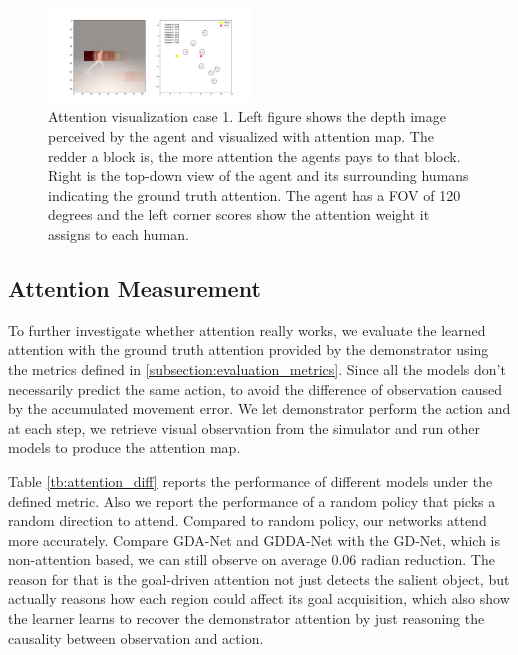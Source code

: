 \documentclass[10pt,twocolumn,letterpaper]{article}
\begin{document}
\begin{figure}[tb]\label{fig:attention_visualization}
  \centering
  \includegraphics[width=0.48\textwidth]{figures/attention_8h_3.png}
  \caption{Attention visualization case 1. Left figure shows the depth image perceived by the agent and visualized with attention map. The redder a block is, the more attention the agents pays to that block. Right is the top-down view of the agent and its surrounding humans indicating the ground truth attention. The agent has a FOV of 120 degrees and the left corner scores show the attention weight it assigns to each human.}
\end{figure}

\subsection{Attention Measurement}
To further investigate whether attention really works, we evaluate the learned attention with the ground truth attention provided by the demonstrator using the metrics defined in \ref{subsection:evaluation_metrics}. Since all the models don't necessarily predict the same action, to avoid the difference of observation caused by the accumulated movement error. We let demonstrator perform the action and at each step, we retrieve visual observation from the simulator and run other models to produce the attention map.

Table \ref{tb:attention_diff} reports the performance of different models under the defined metric. Also we report the performance of a random policy that picks a random direction to attend. Compared to random policy, our networks attend more accurately. Compare GDA-Net and GDDA-Net with the GD-Net, which is non-attention based, we can still observe on average 0.06 radian reduction. The reason for that is the goal-driven attention not just detects the salient object, but actually reasons how each region could affect its goal acquisition, which also show the learner learns to recover the demonstrator attention by just reasoning the causality between observation and action.
\end{document}
